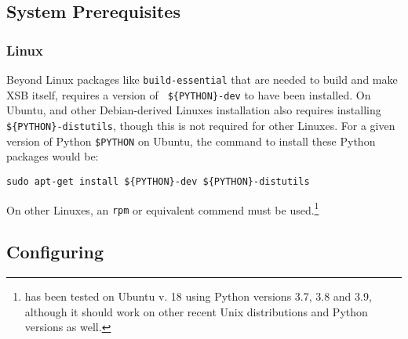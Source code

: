 
\subsection{System Prerequisites}

\subsubsection{Linux}


Beyond Linux packages like {\tt build-essential} that are needed to
build and make XSB itself, \px{} requires a version of {\tt
  \$\{PYTHON\}-dev} to have been installed.  On Ubuntu, and other
Debian-derived Linuxes installation also requires installing {\tt
  \$\{PYTHON\}-distutils}, though this is not required for other
Linuxes. For a given version of Python {\tt \$PYTHON} on Ubuntu, the
command to install these Python packages would be:

{\tt sudo apt-get install \$\{PYTHON\}-dev \$\{PYTHON\}-distutils}

On other Linuxes, an {\tt rpm} or equivalent commend must be
used.\footnote{\px{} has been tested on Ubuntu v. 18 using Python
  versions 3.7, 3.8 and 3.9, although it should work on other recent
  Unix distributions and Python versions as well.}



\subsection{Configuring \px{}}

